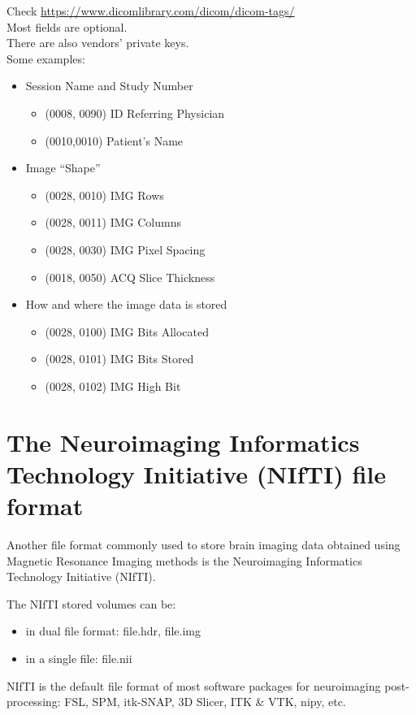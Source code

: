 Check \url{https://www.dicomlibrary.com/dicom/dicom-tags/}\\
Most fields are optional.\\
There are also vendors’ private keys.\\
Some examples:

\begin{itemize}
	\item Session Name and Study Number
	\begin{itemize}
		\item (0008, 0090) ID Referring Physician
		\item (0010,0010) Patient's Name
	\end{itemize}
	\item Image “Shape”
	\begin{itemize}
		\item (0028, 0010) IMG Rows
		\item (0028, 0011) IMG Columns
		\item (0028, 0030) IMG Pixel Spacing
		\item (0018, 0050) ACQ Slice Thickness
	\end{itemize}
	\item How and where the image data is stored
	\begin{itemize}
		\item (0028, 0100) IMG Bits Allocated
		\item (0028, 0101) IMG Bits Stored
		\item (0028, 0102) IMG High Bit
	\end{itemize}
\end{itemize}



\section{The Neuroimaging Informatics Technology Initiative (NIfTI) file format}

Another file format commonly used to store brain imaging data obtained using Magnetic Resonance Imaging methods is the Neuroimaging Informatics Technology Initiative (NIfTI).

The NIfTI stored volumes can be:
\begin{itemize}
	\item in dual file format: file.hdr, file.img
	\item in a single file: file.nii
\end{itemize}

NIfTI is the default file format of most software packages for neuroimaging post-processing: FSL, SPM, itk-SNAP, 3D Slicer, ITK \& VTK, nipy, etc.

